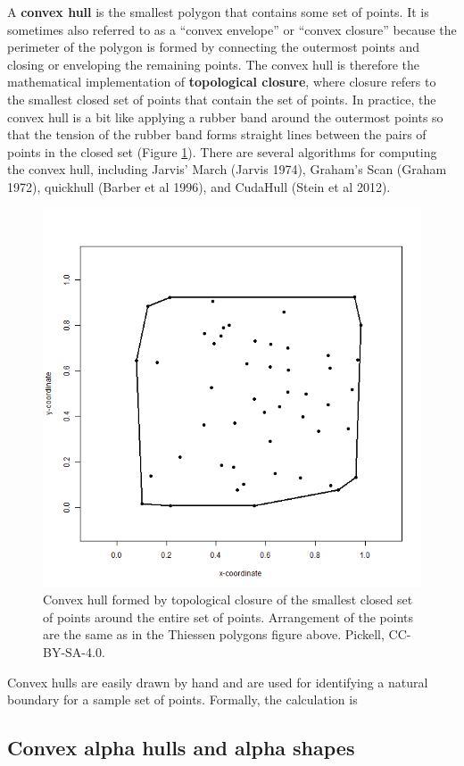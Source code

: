 \documentclass[
]{book}
\begin{document}
A \textbf{convex hull} is the smallest polygon that contains some set of points. It is sometimes also referred to as a ``convex envelope'' or ``convex closure'' because the perimeter of the polygon is formed by connecting the outermost points and closing or enveloping the remaining points. The convex hull is therefore the mathematical implementation of \textbf{topological closure}, where closure refers to the smallest closed set of points that contain the set of points. In practice, the convex hull is a bit like applying a rubber band around the outermost points so that the tension of the rubber band forms straight lines between the pairs of points in the closed set (Figure \ref{fig:7-2d-convex-hull}). There are several algorithms for computing the convex hull, including Jarvis' March (Jarvis 1974), Graham's Scan (Graham 1972), quickhull (Barber et al 1996), and CudaHull (Stein et al 2012).

\begin{figure}
\includegraphics[width=0.75\linewidth]{images/07-2d-convex-hull} \caption{Convex hull formed by topological closure of the smallest closed set of points around the entire set of points. Arrangement of the points are the same as in the Thiessen polygons figure above. Pickell, CC-BY-SA-4.0.}\label{fig:7-2d-convex-hull}
\end{figure}

Convex hulls are easily drawn by hand and are used for identifying a natural boundary for a sample set of points. Formally, the calculation is

\hypertarget{convex-alpha-hulls-and-alpha-shapes}{%
\subsection{Convex alpha hulls and alpha shapes}\label{convex-alpha-hulls-and-alpha-shapes}}
\end{document}
